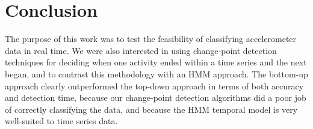 \chapter{Conclusion}
The purpose of this work was to test the feasibility of classifying 
accelerometer data in real time. We were also interested in using change-point
detection techniques for deciding when one activity ended within a time series
and the next began, and to contrast this methodology with an HMM approach.
The bottom-up approach clearly outperformed the top-down approach in terms
of both accuracy and detection time, because our change-point detection
algorithms did a poor job of correctly classifying the data, and because the
HMM temporal model is very well-suited to time series data. 
